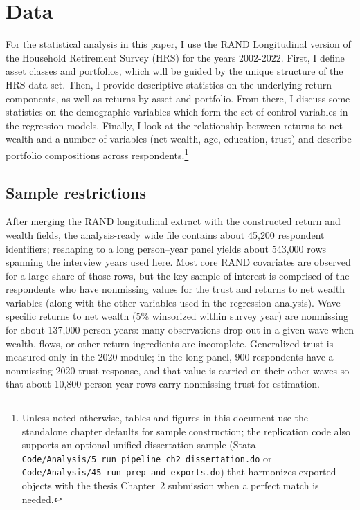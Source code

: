 \onlyinsubfile{\setcounter{section}{2}}

\section{Data}
\label{sec:data}

\par For the statistical analysis in this paper, I use the RAND Longitudinal version of the Household Retirement Survey (HRS) for the years 2002-2022. First, I define asset classes and portfolios, which will be guided by the unique structure of the HRS data set. Then, I provide descriptive statistics on the underlying return components, as well as returns by asset and portfolio. From there, I discuss some statistics on the demographic variables which form the set of control variables in the regression models. Finally, I look at the relationship between returns to net wealth and a number of variables (net wealth, age, education, trust) and describe portfolio compositions across respondents.\footnote{Unless noted otherwise, tables and figures in this document use the standalone chapter defaults for sample construction; the replication code also supports an optional unified dissertation sample (Stata \texttt{Code/Analysis/5\_run\_pipeline\_ch2\_dissertation.do} or \texttt{Code/Analysis/45\_run\_prep\_and\_exports.do}) that harmonizes exported objects with the thesis Chapter~2 submission when a perfect match is needed.}

\subsection{Sample restrictions}
\label{ssec:sample-restrictions}

\par After merging the RAND longitudinal extract with the constructed return and wealth fields, the analysis-ready wide file contains about 45{,}200 respondent identifiers; reshaping to a long person--year panel yields about 543{,}000 rows spanning the interview years used here. Most core RAND covariates are observed for a large share of those rows, but the key sample of interest is comprised of the respondents who have nonmissing values for the trust and returns to net wealth variables (along with the other variables used in the regression analysis). Wave-specific returns to net wealth (5\% winsorized within survey year) are nonmissing for about 137{,}000 person-years: many observations drop out in a given wave when wealth, flows, or other return ingredients are incomplete. Generalized trust is measured only in the 2020 module; in the long panel, 900 respondents have a nonmissing 2020 trust response, and that value is carried on their other waves so that about 10{,}800 person-year rows carry nonmissing trust for estimation.

